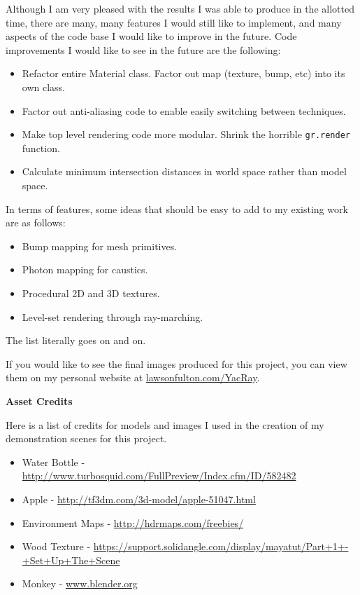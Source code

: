\documentclass[12pt]{article}
\begin{document}
Although I am very pleased with the results I was able to produce in the allotted time, there are many, many features I would still like to implement, and many aspects of the code base I would like to improve in the future. Code improvements I would like to see in the future are the following:
\begin{itemize} \itemsep1pt \parskip0pt 
\item Refactor entire Material class. Factor out map (texture, bump, etc) into its own class.
\item Factor out anti-aliasing code to enable easily switching between techniques.
\item Make top level rendering code more modular. Shrink the horrible \texttt{gr.render} function.
\item Calculate minimum intersection distances in world space rather than model space.
\end{itemize}

In terms of features, some ideas that should be easy to add to my existing work are as follows:

\begin{itemize} \itemsep1pt \parskip0pt 
\item Bump mapping for mesh primitives.
\item Photon mapping for caustics.
\item Procedural 2D and 3D textures.
\item Level-set rendering through ray-marching.
\end{itemize}

The list literally goes on and on.

If you would like to see the final images produced for this project, you can view them on my personal website at \url{lawsonfulton.com/YacRay}.

\newpage

\begin{flushleft}
\Large
\textbf{Asset Credits}
\end{flushleft}

Here is a list of credits for models and images I used in the creation of my demonstration scenes for this project.
\begin{itemize} \itemsep1pt \parskip0pt 
\item Water Bottle - \url{http://www.turbosquid.com/FullPreview/Index.cfm/ID/582482}
\item Apple - \url{http://tf3dm.com/3d-model/apple-51047.html}
\item Environment Maps - \url{http://hdrmaps.com/freebies/}
\item Wood Texture - \url{https://support.solidangle.com/display/mayatut/Part+1+-+Set+Up+The+Scene}
\item Monkey - \url{www.blender.org}
\end{itemize}
\end{document}
